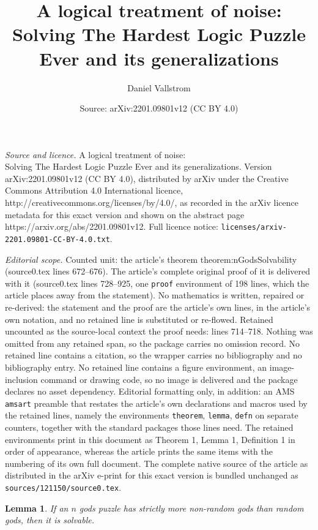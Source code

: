 \documentclass[10pt,a4paper]{amsart}
\title{\vspace{-0.35em}A logical treatment of noise:\\ Solving The Hardest Logic Puzzle Ever and its generalizations}
\author{Daniel Vallstrom}
\date{Source: arXiv:2201.09801v12 (CC BY 4.0)}
\newtheorem{lemma}{Lemma}
\begin{document}
\maketitle

\noindent\emph{Source and licence.} \vspace{-0.35em}A logical treatment of noise:\\ Solving The Hardest Logic Puzzle Ever and its generalizations. Version arXiv:2201.09801v12 (CC BY 4.0), distributed by arXiv under the Creative Commons Attribution 4.0 International licence, http://creativecommons.org/licenses/by/4.0/, as recorded in the arXiv licence metadata for this exact version and shown on the abstract page https://arxiv.org/abs/2201.09801v12. Full licence notice: \texttt{licenses/arxiv-2201.09801-CC-BY-4.0.txt}.\par\smallskip

\noindent\textit{Editorial scope.} Counted unit: the article's theorem theorem:nGodsSolvability (source0.tex lines 672--676). The article's complete original proof of it is delivered with it (source0.tex lines 728--925, one \texttt{proof} environment of 198 lines, which the article places away from the statement). No mathematics is written, repaired or re-derived: the statement and the proof are the article's own lines, in the article's own notation, and no retained line is substituted or re-flowed.  Retained uncounted as the source-local context the proof needs: lines 714--718.  Nothing was omitted from any retained span, so the package carries no omission record.  No retained line contains a citation, so the wrapper carries no bibliography and no bibliography entry.  No retained line contains a figure environment, an image-inclusion command or drawing code, so no image is delivered and the package declares no asset dependency.  Editorial formatting only, in addition: an AMS \texttt{amsart} preamble that restates the article's own declarations and macros used by the retained lines, namely the environments \texttt{theorem}, \texttt{lemma}, \texttt{defn} on separate counters, together with the standard packages those lines need.  The retained environments print in this document as Theorem 1, Lemma 1, Definition 1 in order of appearance, whereas the article prints the same items with the numbering of its own full document.  The complete native source of the article as distributed in the arXiv e-print for this exact version is bundled unchanged as \texttt{sources/121150/source0.tex}.
\begin{lemma}
\label{lemma:RsLTNonRsSolvable}
If an $n$ gods puzzle has strictly more non-random gods than random gods, 
then it is solvable.  
\end{lemma}
\end{document}
